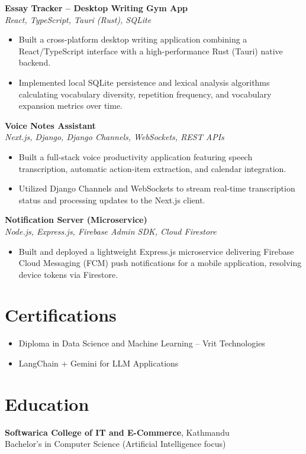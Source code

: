\documentclass[a4paper,10pt]{article}
\begin{document}
\vspace{3pt}
\textbf{Essay Tracker -- Desktop Writing Gym App} \\
\textit{React, TypeScript, Tauri (Rust), SQLite}
\begin{itemize}
    \item Built a cross-platform desktop writing application combining a React/TypeScript interface with a high-performance Rust (Tauri) native backend.
    \item Implemented local SQLite persistence and lexical analysis algorithms calculating vocabulary diversity, repetition frequency, and vocabulary expansion metrics over time.
\end{itemize}

\vspace{3pt}
\textbf{Voice Notes Assistant} \\
\textit{Next.js, Django, Django Channels, WebSockets, REST APIs}
\begin{itemize}
    \item Built a full-stack voice productivity application featuring speech transcription, automatic action-item extraction, and calendar integration.
    \item Utilized Django Channels and WebSockets to stream real-time transcription status and processing updates to the Next.js client.
\end{itemize}

\vspace{3pt}
\textbf{Notification Server (Microservice)} \\
\textit{Node.js, Express.js, Firebase Admin SDK, Cloud Firestore}
\begin{itemize}
    \item Built and deployed a lightweight Express.js microservice delivering Firebase Cloud Messaging (FCM) push notifications for a mobile application, resolving device tokens via Firestore.
\end{itemize}

\section*{Certifications}
\begin{itemize}
    \item Diploma in Data Science and Machine Learning -- Vrit Technologies
    \item LangChain + Gemini for LLM Applications
\end{itemize}

\section*{Education}
\textbf{Softwarica College of IT and E-Commerce}, Kathmandu \\
Bachelor's in Computer Science (Artificial Intelligence focus)
\end{document}
